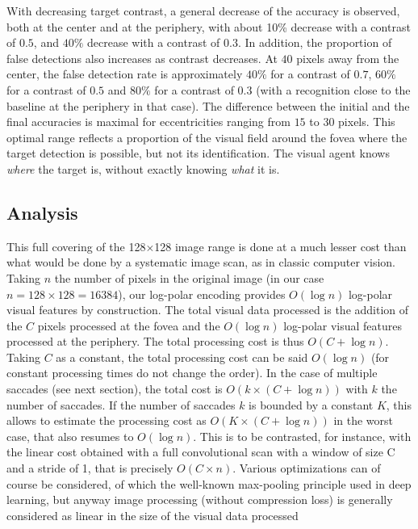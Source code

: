 With decreasing target contrast, a general decrease of the accuracy is observed, both at the center and at the periphery, with about 10\% decrease with a contrast of $0.5$, and $40\%$ decrease with a contrast of $0.3$. In addition, the proportion of false detections also increases as contrast decreases. At $40$ pixels away from the center, the false detection rate is approximately $40\%$ for a contrast of $0.7$, $60\%$ for a contrast of $0.5$ and $80\%$ for a contrast of $0.3$ (with a recognition close to the baseline at the periphery in that case). The difference between the initial and the final accuracies is maximal for eccentricities ranging from $15$ to $30$ pixels. This optimal range reflects a proportion of the visual field around the fovea where the target detection is possible, but not its identification. The visual agent knows \emph{where} the target is, without exactly knowing \emph{what} it is.

\subsection{Analysis}
This full covering of the 128$\times$128 image range is done at a much lesser cost than what would be done by a systematic image scan, as in classic computer vision. Taking $n$ the number of pixels in the original image (in our case $n=128\times128=16384$), our log-polar encoding provides $O(\log n)$ log-polar visual features by construction. The total visual data processed is the addition of the $C$ pixels processed at the fovea and the $O(\log n)$ log-polar visual features processed at the periphery. The total processing cost is thus $O(C+\log n)$. Taking $C$ as a constant, the total processing cost can be said $O(\log n)$ (for constant processing times do not change the order).
In the case of multiple saccades (see next section), the total cost is $O(k\times(C+\log n))$ with $k$ the number of saccades. If the number of saccades $k$ is bounded by a constant $K$, this allows to estimate the processing cost as $O(K\times(C+\log n))$ in the worst case, that also resumes to $O(\log n)$.
This is to be contrasted, for instance, with the linear cost obtained with a full convolutional scan with a window of size C and a stride of 1, that is precisely $O(C\times n)$. Various optimizations can of course be considered, of which the well-known max-pooling principle used in deep learning, but anyway
image processing (without compression loss) is generally considered as linear in the size of the visual data processed \cite{strengert2006pyramid}

